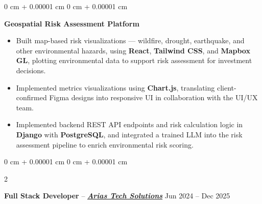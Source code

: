 \documentclass[7pt, letterpaper]{extarticle}
\newenvironment{highlights}{
    \begin{itemize}[
        topsep=0.05 cm,
        parsep=0.05 cm,
        partopsep=0pt,
        itemsep=0pt,
        leftmargin=0.6 cm
    ]
}{
    \end{itemize}
} %
\newenvironment{onecolentry}{
    \begin{adjustwidth}{
        0 cm + 0.00001 cm
    }{
        0 cm + 0.00001 cm
    }
}{
    \end{adjustwidth}
} %
\newenvironment{twocolentry}[2][]{
    \onecolentry
    \def\secondColumn{#2}
    \setcolumnwidth{\fill, 4.5 cm}
    \begin{paracol}{2}
}{
    \switchcolumn \raggedleft \secondColumn
    \end{paracol}
    \endonecolentry
} %
\let\hrefWithoutArrow\href
\begin{document}
        \begin{onecolentry}
            \hspace{0.3 cm}\textbf{Geospatial Risk Assessment Platform} \\
            \begin{highlights}
                \item Built map-based risk visualizations — wildfire, drought, earthquake, and other environmental hazards, using \textbf{React}, \textbf{Tailwind CSS}, and \textbf{Mapbox GL}, plotting environmental data to support risk assessment for investment decisions.
                \item Implemented metrics visualizations using \textbf{Chart.js}, translating client-confirmed Figma designs into responsive UI in collaboration with the UI/UX team.
                \item Implemented backend REST API endpoints and risk calculation logic in \textbf{Django} with \textbf{PostgreSQL}, and integrated a trained LLM into the risk assessment pipeline to enrich environmental risk scoring.
            \end{highlights}
        \end{onecolentry}
        \vspace{0.20 cm}

        \begin{twocolentry}{
            Jun 2024 – Dec 2025
        }
        \textbf{Full Stack Developer} -- \textbf{\textit{\hrefWithoutArrow{https://www.ariastechsolutions.com/}{Arias Tech Solutions}}} \end{twocolentry}
        \vspace{0.10 cm}
\end{document}

